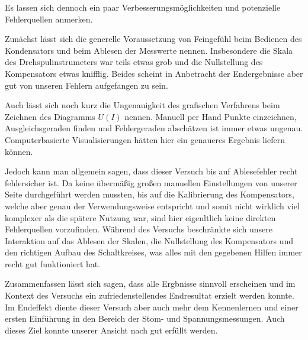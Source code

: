 \documentclass{article}
\begin{document}
Es lassen sich dennoch ein paar Verbesserungsmöglichkeiten und potenzielle Fehlerquellen anmerken.

Zunächst lässt sich die generelle Voraussetzung von Feingefühl beim Bedienen des Kondensators und beim Ablesen der Messwerte nennen. Insbesondere die Skala des Drehspulinstrumeters war teils etwas grob und die Nullstellung des Kompensators etwas knifflig. Beides scheint in Anbetracht der Endergebnisse aber gut von unseren Fehlern aufgefangen zu sein.

Auch lässt sich noch kurz die Ungenauigkeit des grafischen Verfahrens beim Zeichnen des Diagramms $U(I)$ nennen. Manuell per Hand Punkte einzeichnen, Ausgleichsgeraden finden und Fehlergeraden abschätzen ist immer etwas ungenau. Computerbasierte Visualisierungen hätten hier ein genaueres Ergebnis liefern können.

Jedoch kann man allgemein sagen, dass dieser Versuch bis auf Ablesefehler recht fehlersicher ist. Da keine übermäßig großen manuellen Einstellungen von unserer Seite durchgeführt werden mussten, bis auf die Kalibrierung des Kompensators, welche aber genau der Verwendungsweise entspricht und somit nicht wirklich viel komplexer als die spätere Nutzung war, sind hier eigenltlich keine direkten Fehlerquellen vorzufinden. Während des Versuchs beschränkte sich unsere Interaktion auf das Ablesen der Skalen, die Nullstellung des Kompensators und den richtigen Aufbau des Schaltkreises, was alles mit den gegebenen Hilfen immer recht gut funktioniert hat. 

Zusammenfassen lässt sich sagen, dass alle Ergbnisse sinnvoll erscheinen und im Kontext des Versuchs ein zufriedenstellendes Endresultat erzielt werden konnte. Im Endeffekt diente dieser Versuch aber auch mehr dem Kennenlernen und einer ersten Einführung in den Bereich der Stom- und Spannungsmessungen. Auch dieses Ziel konnte unserer Ansicht nach gut erfüllt werden. 
\end{document}
